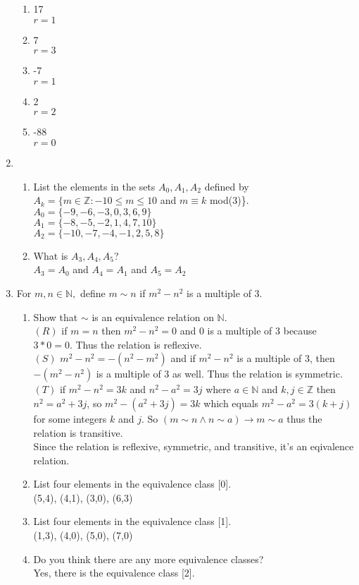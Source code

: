 \documentclass[11pt]{article}
\newcommand{\N}{\mathbb{N}}
\newcommand{\Z}{\mathbb{Z}}
\begin{document}
\begin{enumerate}
\begin{enumerate}
	\item 17\\
	$r=1$
	\item 7\\
	$r=3$
	\item -7\\
	$r=1$
	\item 2\\
	$r=2$
	\item -88\\
	$r=0$
	\end{enumerate}
\setcounter{enumi}{7}
\item
	\begin{enumerate}
	\item List the elements in the sets $A_0,A_1,A_2$ defined by\\
		$A_k=\{m\in\Z:-10\leq m\leq 10$ and $m\equiv k$ mod(3)\}.\\
	$A_0=\{-9,-6,-3,0,3,6,9\}$\\
	$A_1=\{-8,-5,-2,1,4,7,10\}$\\
	$A_2=\{-10,-7,-4,-1,2,5,8\}$
	\item What is $A_3,A_4,A_5$?\\
	$A_3=A_0$ and $A_4=A_1$ and $A_5=A_2$
	\end{enumerate}
\setcounter{enumi}{11}
\item For $m,n\in\N,$ define $m\sim n$ if $m^2-n^2$ is a multiple of 3.
	\begin{enumerate}
	\item Show that $\sim$ is an equivalence relation on $\N$.\\
	$(R)$ if $m=n$ then $m^2-n^2=0$ and 0 is a multiple of 3 because $3*0=0$. Thus the relation is reflexive.\\
	$(S)$ $m^2-n^2=-(n^2-m^2)$ and if $m^2-n^2$ is a multiple of 3, then $-(m^2-n^2)$ is a multiple of 3 as well. Thus the 			relation is symmetric. \\
	$(T)$ if $m^2-n^2=3k$ and $n^2-a^2=3j$ where $a\in\N$ and $k,j\in\Z$ then $n^2=a^2+3j$, so $m^2-(a^2+3j)=3k$ which equals
	$m^2-a^2=3(k+j)$ for some integers $k$ and $j$. So $(m\sim n\wedge n\sim a)\to m\sim a$ thus the relation is transitive.\\
	Since the relation is reflexive, symmetric, and transitive, it's an eqivalence relation.
	\item List four elements in the equivalence class [0].\\
	(5,4), (4,1), (3,0), (6,3)
	\item List four elements in the equivalence class [1].\\
	(1,3), (4,0), (5,0), (7,0)
	\item Do you think there are any more equivalence classes?\\
	Yes, there is the equivalence class [2].
	\end{enumerate}
\end{enumerate}
\end{document}
